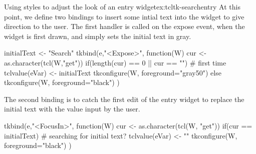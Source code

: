 \begin{example}{Using styles to adjust the look of an entry widget}{ex:tcltk-searchentry}
At this point, we define two bindings to insert some intial text into
the widget to give direction to the user. The first handler is called
on the expose event, when the widget is first drawn, and simply sets
the initial text in gray.
\begin{Schunk}
\begin{Sinput}
 initialText <- "Search"
 tkbind(e,"<Expose>", function(W) {
   cur <- as.character(tcl(W,"get"))
   if(length(cur) == 0 || cur == "") {    # first time
     tclvalue(eVar) <- initialText
     tkconfigure(W, foreground="gray50")
   } else {
     tkconfigure(W, foreground="black")
   }
 })
\end{Sinput}
\end{Schunk}
The second binding is to catch the first edit of the entry widget to replace the initial text with the value input by the user.
\begin{Schunk}
\begin{Sinput}
 tkbind(e,"<FocusIn>", function(W) {
   cur <- as.character(tcl(W, "get"))
   if(cur == initialText) {              # searching for initial text?
     tclvalue(eVar) <- ""
     tkconfigure(W, foreground="black")
   }
 })
\end{Sinput}
\end{Schunk}
\end{example}
